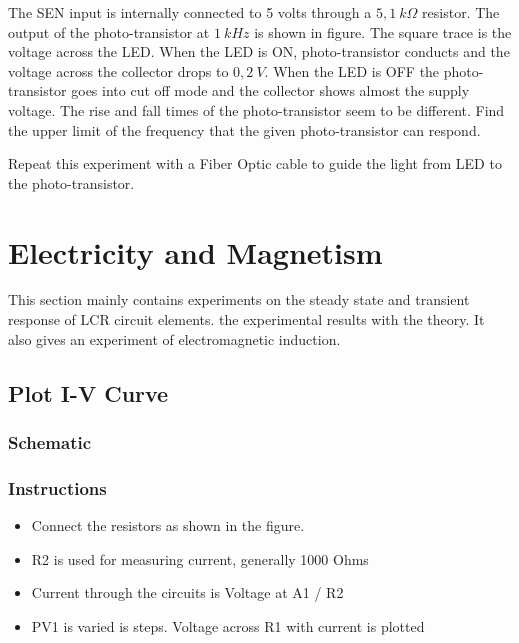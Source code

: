 \documentclass[a4paper,12pt,english]{sphinxmanual}
\let\sphinxpxdimen\pdfpxdimen\else\newdimen\sphinxpxdimen
\begin{document}

The SEN input is internally connected to 5 volts through a \(5,1~k\Omega\)
resistor. The output of the photo-transistor at \(1~kHz\) is shown in figure.
The square trace is the voltage across the LED. When the LED is ON,
photo-transistor conducts and the voltage across the collector drops to
\(0,2~V\). When the LED is OFF the photo-transistor goes into cut off
mode and the collector shows almost the supply voltage. The rise and
fall times of the photo-transistor seem to be different. Find the upper
limit of the frequency that the given photo-transistor can respond.

Repeat this experiment with a Fiber Optic cable to guide the light from
LED to the photo-transistor.


\chapter{Electricity and Magnetism}
\label{\detokenize{index:electricity-and-magnetism}}
This section mainly contains experiments on the steady state and
transient response of LCR circuit elements. the experimental results
with the theory. It also gives an experiment of electromagnetic
induction.


\section{Plot I-V Curve}
\label{\detokenize{4.1:plot-i-v-curve}}\label{\detokenize{4.1::doc}}

\subsection{Schematic}
\label{\detokenize{4.1:schematic}}
\noindent\sphinxincludegraphics[width=300\sphinxpxdimen]{{res-compare}.pdf}


\subsection{Instructions}
\label{\detokenize{4.1:instructions}}\begin{itemize}
\item {} 
Connect the resistors as shown in the figure.

\item {} 
R2 is used for measuring current, generally 1000 Ohms

\item {} 
Current through the circuits is Voltage at A1 / R2

\item {} 
PV1 is varied is steps. Voltage across R1 with current is plotted

\end{itemize}
\end{document}

